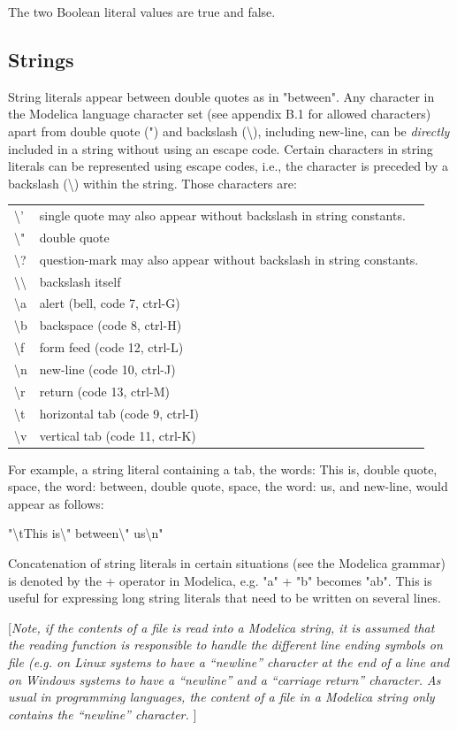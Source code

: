 \documentclass[10pt,a4paper]{report}
\def\Mcomment#1{{[}\emph{#1}{]}}
\begin{document}
The two Boolean literal values are true and false.

\subsection{Strings}

String literals appear between double quotes as in "between". Any
character in the Modelica language character set (see appendix B.1 for
allowed characters) apart from double quote (") and backslash
(\textbackslash{}), including new-line, can be \emph{directly} included
in a string without using an escape code. Certain characters in string
literals can be represented using escape codes, i.e., the character is
preceded by a backslash (\textbackslash{}) within the string. Those
characters are:

\begin{longtable}[c]{@{}ll@{}}
\textbackslash{}' & single quote may also appear without backslash in
string constants.\tabularnewline
\textbackslash{}" & double quote\tabularnewline
\textbackslash{}? & question-mark may also appear without backslash in
string constants.\tabularnewline
\textbackslash{}\textbackslash{} & backslash itself\tabularnewline
\textbackslash{}a & alert (bell, code 7, ctrl-G)\tabularnewline
\textbackslash{}b & backspace (code 8, ctrl-H)\tabularnewline
\textbackslash{}f & form feed (code 12, ctrl-L)\tabularnewline
\textbackslash{}n & new-line (code 10, ctrl-J)\tabularnewline
\textbackslash{}r & return (code 13, ctrl-M)\tabularnewline
\textbackslash{}t & horizontal tab (code 9, ctrl-I)\tabularnewline
\textbackslash{}v & vertical tab (code 11, ctrl-K)\tabularnewline

\end{longtable}

For example, a string literal containing a tab, the words: This is,
double quote, space, the word: between, double quote, space, the word:
us, and new-line, would appear as follows:

"\textbackslash{}tThis is\textbackslash{}" between\textbackslash{}"
us\textbackslash{}n"

Concatenation of string literals in certain situations (see the Modelica
grammar) is denoted by the + operator in Modelica, e.g. "a" + "b"
becomes "ab". This is useful for expressing long string literals that
need to be written on several lines.

\Mcomment{Note, if the contents of a file is read into a Modelica string,
it is assumed that the reading function is responsible to handle the
different line ending symbols on file (e.g. on Linux systems to have a
``newline'' character at the end of a line and on Windows systems to
have a ``newline'' and a ``carriage return'' character. As usual in
programming languages, the content of a file in a Modelica string only
contains the ``newline'' character. }
\end{document}
